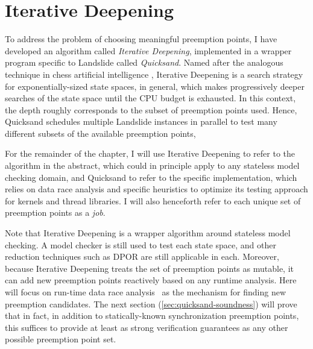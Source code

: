 \section{Iterative Deepening}
\label{sec:quicksand-id}

To address the problem of choosing meaningful preemption points,
I have developed an algorithm called {\em Iterative Deepening},
implemented in a wrapper program specific to Landslide called {\em Quicksand}.
Named after the analogous technique in chess artificial intelligence \cite{iterative-deepening-chess-ai},
Iterative Deepening
is a search strategy
for exponentially-sized state spaces, in general,
which
makes progressively deeper searches of the state space until the CPU budget is exhausted.
In this context, the depth roughly corresponds to the subset of preemption points used.
Hence, Quicksand
schedules multiple Landslide instances in parallel to
test many different subsets of the available preemption points,

For the remainder of the chapter, I will use Iterative Deepening to refer to the algorithm in the abstract,
which could in principle apply to any stateless model checking domain,
and Quicksand to refer to the specific implementation,
which relies on data race analysis and specific heuristics to optimize its testing approach
for kernels and thread libraries.
I will also henceforth refer to each unique set of preemption points as a {\em job}.



Note that Iterative Deepening is a wrapper algorithm around stateless model checking.
A model checker is still used to test each state space, and other reduction techniques such as DPOR
are still applicable in each.
Moreover, because Iterative Deepening treats the set of preemption points as mutable,
it can add new preemption points reactively based on any runtime analysis.
Here
will focus on run-time data race analysis~\cite{tsan,fasttrack} as the mechanism for finding new preemption candidates.
The next section (\cref{sec:quicksand-soundness})
will prove that in fact,
in addition to statically-known synchronization preemption points,
this suffices to provide at least as strong verification guarantees as any other possible preemption point set.

